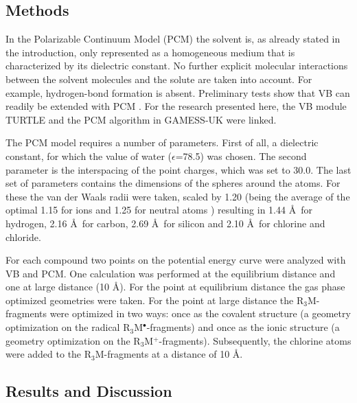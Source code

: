 \subsection{Methods}

In the Polarizable Continuum Model (PCM) the solvent is, as already stated in the introduction, only represented as a homogeneous medium that is characterized by its dielectric constant. No further explicit molecular interactions between the solvent molecules and the solute are taken into account. For example, hydrogen-bond formation is absent. Preliminary tests show that VB can readily be extended with PCM \cite{song}. For the research presented here, the VB module TURTLE and the PCM algorithm in GAMESS-UK were linked. 

The PCM model requires a number of parameters. First of all, a dielectric constant, for which the value of water ($\epsilon$=78.5) was chosen. The second parameter is the interspacing of the point charges, which was set to 30.0\degrees. The last set of parameters contains the dimensions of the spheres around the atoms. For these the van der Waals radii \cite{bondi} were taken, scaled by 1.20 (being the average of the optimal 1.15 for ions and 1.25 for neutral atoms \cite{scaling}) resulting in 1.44 \AA\  for hydrogen, 2.16 \AA\  for carbon, 2.69 \AA\ for silicon and 2.10 \AA\ for chlorine and chloride.

For each compound two points on the potential energy curve were analyzed with VB and PCM. One calculation was performed at the equilibrium distance and one at large distance (10 \AA). For the point at equilibrium distance the gas phase optimized geometries were taken. For the point at large distance the R$_3$M-fragments were optimized in two ways: once as the covalent structure (a geometry optimization on the radical R$_3$M$^\bullet$-fragments) and once as the ionic structure (a geometry optimization on the R$_3$M$^{+}$-fragments). Subsequently, the chlorine atoms were added to the R$_3$M-fragments at a distance of 10 \AA. 

\subsection{Results and Discussion}

